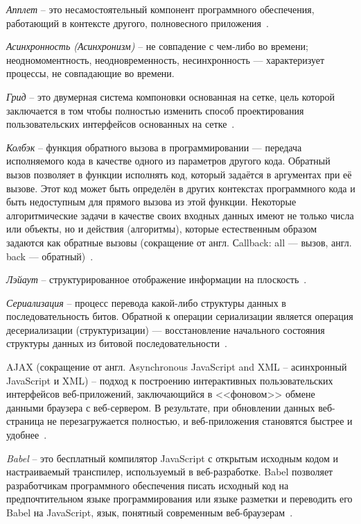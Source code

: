 \label{sec:definitions}

\emph{Апплет} -- это несамостоятельный компонент программного обеспечения, работающий в контексте другого, полновесного приложения~\cite{wiki_applet}.

\emph{Асинхронность (Асинхронизм)} -- не совпадение с чем-либо во времени; неодномоментность, неодновременность, несинхронность — характеризует процессы, не совпадающие во времени.

\emph{Грид} -- это двумерная система компоновки основанная на сетке, цель которой заключается в том чтобы полностью изменить способ проектирования пользовательских интерфейсов основанных на сетке~\cite{grid}.

\emph{Колбэк} -- функция обратного вызова в программировании — передача исполняемого кода в качестве одного из параметров другого кода. Обратный вызов позволяет в функции исполнять код, который задаётся в аргументах при её вызове. Этот код может быть определён в других контекстах программного кода и быть недоступным для прямого вызова из этой функции. Некоторые алгоритмические задачи в качестве своих входных данных имеют не только числа или объекты, но и действия (алгоритмы), которые естественным образом задаются как обратные вызовы (сокращение от англ. Сallback: all — вызов, англ. back — обратный)~\cite{wiki_callback}.

\emph{Лэйаут} -- структурированное отображение информации на плоскость~\cite{wiki_layout}.

\emph{Сериализация} -- процесс перевода какой-либо структуры данных в последовательность битов. Обратной к операции сериализации является операция десериализации (структуризации) — восстановление начального состояния структуры данных из битовой последовательности~\cite{wiki_serialization}.

AJAX (сокращение от англ. Asynchronous JavaScript and XML -- асинхронный JavaScript и XML) -- подход к построению интерактивных пользовательских интерфейсов веб-приложений, заключающийся в <<фоновом>> обмене данными браузера с веб-сервером. В результате, при обновлении данных веб-страница не перезагружается полностью, и веб-приложения становятся быстрее и удобнее~\cite{wiki_ajax}.

\emph{Babel} -- это бесплатный компилятор JavaScript с открытым исходным кодом и настраиваемый транспилер, используемый в веб-разработке. Babel позволяет разработчикам программного обеспечения писать исходный код на предпочтительном языке программирования или языке разметки и переводить его Babel на JavaScript, язык, понятный современным веб-браузерам~\cite{babel}.

